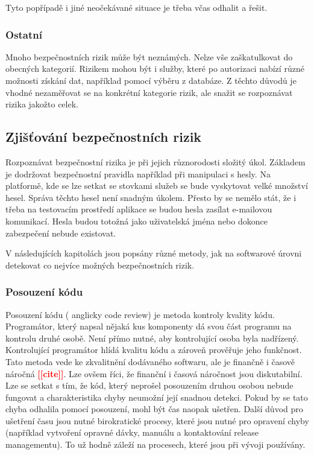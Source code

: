 \documentclass[thesis=M,czech]{FITthesis}[2012/10/20]
\newcommand{\todo}[1]{\textcolor{red}{\textbf{[[#1]]}}}
\begin{document}
				Tyto popřípadě i jiné neočekávané situace je třeba včas odhalit a řešit.
				
			\subsubsection{Ostatní}
				Mnoho bezpečnostních rizik může být neznámých. Nelze vše zaškatulkovat do obecných kategorií. Rizikem mohou být i služby, které po autorizaci nabízí různé možnosti získání dat, například pomocí výběru z databáze. Z těchto důvodů je vhodné nezaměřovat se na konkrétní kategorie rizik, ale snažit se rozpoznávat rizika jakožto celek.	
			
		\subsection{Zjišťování bezpečnostních rizik}
			Rozpoznávat bezpečnostní rizika je při jejich různorodosti složitý úkol. Základem je dodržovat bezpečnostní pravidla například při manipulaci s hesly. Na platformě, kde se lze setkat se stovkami služeb se bude vyskytovat velké množství hesel. Správa těchto hesel není snadným úkolem. Přesto by se nemělo stát, že i třeba na testovacím prostředí aplikace se budou hesla zasílat e-mailovou komunikací. Hesla budou totožná jako uživatelská jména nebo dokonce zabezpečení nebude existovat. 
			
			V následujících kapitolách jsou popsány různé metody, jak na softwarové úrovni detekovat co nejvíce možných bezpečnostních rizik.
			
			\subsubsection{Posouzení kódu}
				Posouzení kódu ( anglicky code review) je metoda kontroly kvality kódu. Programátor, který napsal nějaká kus komponenty dá svou část programu na kontrolu druhé osobě. Není přímo nutné, aby kontrolující osoba byla nadřízený. Kontrolující programátor hlídá kvalitu kódu a zároveň prověřuje jeho funkčnost. Tato metoda vede ke zkvalitnění dodávaného softwaru, ale je finančně i časově náročná \todo{cite}. Lze ovšem říci, že finanční i časová náročnost jsou diskutabilní. Lze se setkat s tím, že kód, který neprošel posouzením druhou osobou nebude fungovat a charakteristika chyby neumožní její snadnou detekci. Pokud by se tato chyba odhalila pomocí posouzení, mohl být čas naopak ušetřen. Další důvod pro ušetření času jsou nutné birokratické procesy, které jsou nutné pro opravení chyby (například vytvoření opravné dávky, manuálu a kontaktování release managementu). To už hodně záleží na procesech, které jsou při vývoji používány. 
			
\end{document}
